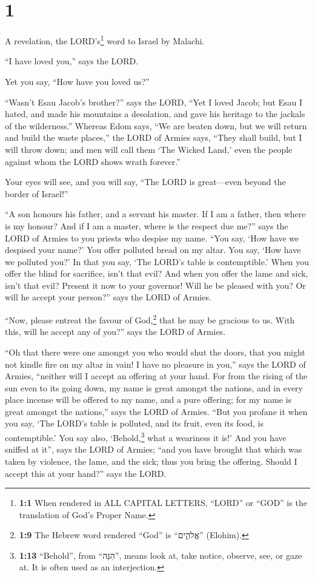 \hypertarget{section}{%
\section{1}\label{section}}

 A revelation, the LORD's\footnote{\textbf{1:1} When
  rendered in ALL CAPITAL LETTERS, ``LORD'' or ``GOD'' is the
  translation of God's Proper Name.} word to Israel by Malachi.

 ``I have loved you,'' says the LORD.

Yet you say, ``How have you loved us?''

``Wasn't Esau Jacob's brother?'' says the LORD, ``Yet I loved Jacob;
 but Esau I hated, and made his mountains a desolation,
and gave his heritage to the jackals of the wilderness.'' 
Whereas Edom says, ``We are beaten down, but we will return and build
the waste places,'' the LORD of Armies says, ``They shall build, but I
will throw down; and men will call them `The Wicked Land,' even the
people against whom the LORD shows wrath forever.''

 Your eyes will see, and you will say, ``The LORD is
great---even beyond the border of Israel!''

 ``A son honours his father, and a servant his master. If
I am a father, then where is my honour? And if I am a master, where is
the respect due me?'' says the LORD of Armies to you priests who despise
my name. ``You say, `How have we despised your name?'  You
offer polluted bread on my altar. You say, `How have we polluted you?'
In that you say, `The LORD's table is contemptible.'  When
you offer the blind for sacrifice, isn't that evil? And when you offer
the lame and sick, isn't that evil? Present it now to your governor!
Will he be pleased with you? Or will he accept your person?'' says the
LORD of Armies.

 ``Now, please entreat the favour of God,\footnote{\textbf{1:9}
  The Hebrew word rendered ``God'' is ``אֱלֹהִ֑ים'' (Elohim).} that he
may be gracious to us. With this, will he accept any of you?'' says the
LORD of Armies.

 ``Oh that there were one amongst you who would shut the
doors, that you might not kindle fire on my altar in vain! I have no
pleasure in you,'' says the LORD of Armies, ``neither will I accept an
offering at your hand.  For from the rising of the sun
even to its going down, my name is great amongst the nations, and in
every place incense will be offered to my name, and a pure offering; for
my name is great amongst the nations,'' says the LORD of Armies.
 ``But you profane it when you say, `The LORD's table is
polluted, and its fruit, even its food, is contemptible.'
 You say also, `Behold,\footnote{\textbf{1:13}
  ``Behold'', from ``הִנֵּה'', means look at, take notice, observe, see,
  or gaze at. It is often used as an interjection.} what a weariness it
is!' And you have sniffed at it'', says the LORD of Armies; ``and you
have brought that which was taken by violence, the lame, and the sick;
thus you bring the offering. Should I accept this at your hand?'' says
the LORD.

